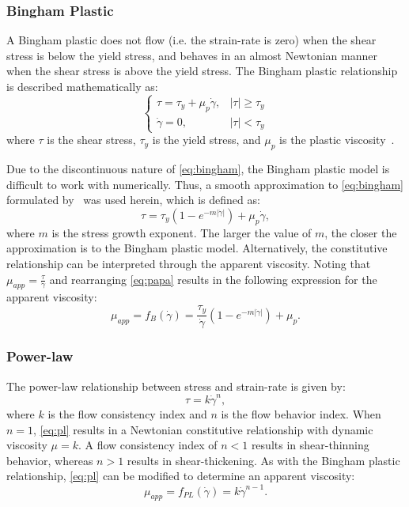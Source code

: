 \subsubsection{Bingham Plastic} \label{sec:bp}

A Bingham plastic does not flow (i.e. the strain-rate is zero) when the shear stress is below the yield stress, and behaves in an almost Newtonian manner when the shear stress is above the yield stress.
The Bingham plastic relationship is described mathematically as:
\begin{equation} \label{eq:bingham}
\begin{cases}
\tau = \tau_y + \mu_p \dot{\gamma}, & |\tau| \geq \tau_y \\
\dot{\gamma} = 0, & |\tau| < \tau_y
\end{cases}
\end{equation}
\noindent where $\tau$ is the shear stress, $\tau_y$ is the yield stress, and $\mu_p$ is the plastic viscosity~\cite{bingham1922fluidity}.

Due to the discontinuous nature of \eqref{eq:bingham}, the Bingham plastic model is difficult to work with numerically.
Thus, a smooth approximation to \eqref{eq:bingham} formulated by~\citet{papanastasiou1987flows} was used herein, which is defined as:
\begin{equation} \label{eq:papa}
\tau = \tau_y (1 - e^{-m |\dot{\gamma}|}) + \mu_p \dot{\gamma},
\end{equation}
\noindent where $m$ is the stress growth exponent.
The larger the value of $m$, the closer the approximation is to the Bingham plastic model.
Alternatively, the constitutive relationship can be interpreted through the apparent viscosity.
Noting that $\mu_{app} = \frac{\tau}{\dot{\gamma}}$ and rearranging \eqref{eq:papa} results in the following expression for the apparent viscosity:
\begin{equation} \label{eq:bing-mu-app}
  \mu_{app} = f_B(\dot{\gamma}) = \frac{\tau_y}{\dot{\gamma}} (1 - e^{-m |\dot{\gamma}|}) + \mu_p.
\end{equation}

\subsubsection{Power-law}

The power-law relationship between stress and strain-rate is given by:
\begin{equation} \label{eq:pl}
\tau = k \dot{\gamma}^n,
\end{equation}
\noindent where $k$ is the flow consistency index and $n$ is the flow behavior index.
When $n = 1$, \eqref{eq:pl} results in a Newtonian constitutive relationship with dynamic viscosity $\mu = k$.
A flow consistency index of $n < 1$ results in shear-thinning behavior, whereas $n > 1$ results in shear-thickening.
As with the Bingham plastic relationship, \eqref{eq:pl} can be modified to determine an apparent viscosity:
\begin{equation} \label{eq:pl-mu-app}
  \mu_{app} = f_{PL}(\dot{\gamma}) = k \dot{\gamma}^{n-1}.
\end{equation}

